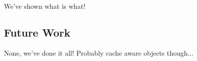 We've shown what is what!

\subsection{Future Work}

None, we've done it all! Probably cache aware objects though...